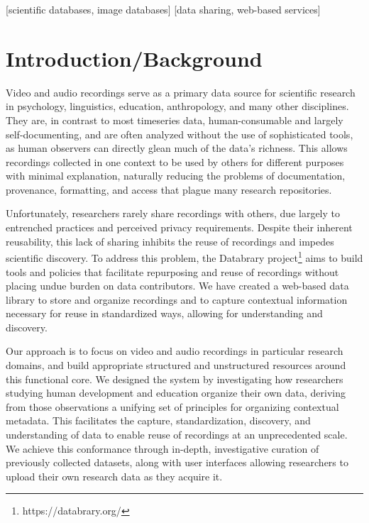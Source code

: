 \documentclass{sig-alternate}
\begin{document}
[scientific databases, image databases]
[data sharing, web-based services]



\section{Introduction/Background}

Video and audio recordings serve as a primary data source for scientific research in psychology, linguistics, education, anthropology, and many other disciplines.
They are, in contrast to most timeseries data, human-consumable and largely self-documenting, and are often analyzed without the use of sophisticated tools, as human observers can directly glean much of the data's richness.
This allows recordings collected in one context to be used by others for different purposes with minimal explanation, naturally reducing the problems of documentation, provenance, formatting, and access that plague many research repositories.

Unfortunately, researchers rarely share recordings with others, due largely to entrenched practices and perceived privacy requirements.
Despite their inherent reusability, this lack of sharing inhibits the reuse of recordings and impedes scientific discovery.
To address this problem, the Databrary project\footnote{https://databrary.org/} aims to build tools and policies that facilitate repurposing and reuse of recordings without placing undue burden on data contributors.
We have created a web-based data library to store and organize recordings and to capture contextual information necessary for reuse in standardized ways, allowing for understanding and discovery.

Our approach is to focus on video and audio recordings in particular research domains, and build appropriate structured and unstructured resources around this functional core.
We designed the system by investigating how researchers studying human development and education organize their own data, deriving from those observations a unifying set of principles for organizing contextual metadata.
This facilitates the capture, standardization, discovery, and understanding of data to enable reuse of recordings at an unprecedented scale.
We achieve this conformance through in-depth, investigative curation of previously collected datasets, along with user interfaces allowing researchers to upload their own research data as they acquire it.
\end{document}
